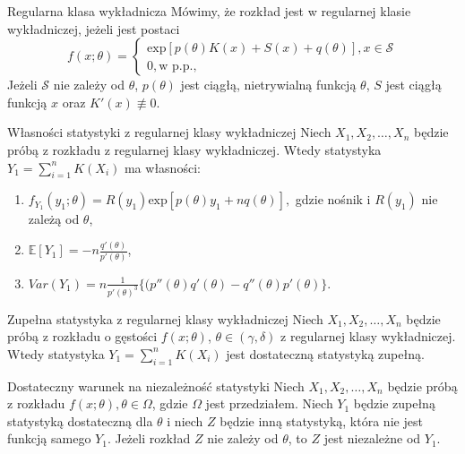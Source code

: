 \documentclass[avery5371, grid, frame]{flashcards}
\begin{document}
\begin{flashcard}[Definicja]{Regularna klasa wykładnicza}
    Mówimy, że rozkład jest w regularnej klasie wykładniczej, jeżeli jest postaci
    $$ f(x; \theta) =
    \begin{cases}
        \text{exp}[p(\theta) K(x) + S(x) + q(\theta)], x \in \mathcal{S} \\
        0, \text{w p.p.,} 
    \end{cases} $$
    Jeżeli $\mathcal{S}$ nie zależy od $\theta$, $p(\theta)$ jest ciągłą, nietrywialną funkcją $\theta$, $S$ jest ciągłą funkcją $x$ oraz $K'(x) \not\equiv 0$.
\end{flashcard}
    
\begin{flashcard}[Twierdzenie]{Własności statystyki z regularnej klasy wykładniczej}
    Niech $X_1, X_2, \dots, X_n$ będzie próbą z rozkładu z regularnej klasy wykładniczej. Wtedy statystyka $Y_1 = \sum_{i=1}^n K(X_i)$ ma własności:
    \begin{enumerate}
        \item $f_{Y_1}(y_1; \theta) = R(y_1) \text{exp}[p(\theta) y_1 + n q(\theta)],$ gdzie nośnik i $R(y_1)$ nie zależą od $\theta$,
        \item $\mathbb{E}[Y_1] = -n \frac{q'(\theta)}{p'(\theta)}$,
        \item $Var(Y_1) = n \frac{1}{p'(\theta)^3} \{ (p''(\theta)q'(\theta) - q''(\theta)p'(\theta) \} $.
    \end{enumerate}
\end{flashcard}

\begin{flashcard}[Twierdzenie]{Zupełna statystyka z regularnej klasy wykładniczej}
    Niech $X_1, X_2, \dots, X_n$ będzie próbą z rozkładu o gęstości $f(x; \theta)$, $\theta \in (\gamma, \delta)$ z regularnej klasy wykładniczej. Wtedy statystyka $Y_1 = \sum_{i=1}^n K(X_i)$ jest dostateczną statystyką zupełną.
\end{flashcard}

\begin{flashcard}[Twierdzenie]{Dostateczny warunek na niezależność statystyki}
    Niech $X_1, X_2, \dots, X_n$ będzie próbą z rozkładu $f(x; \theta), \theta \in \Omega$, gdzie $\Omega$ jest przedziałem. Niech $Y_1$ będzie zupełną statystyką dostateczną dla $\theta$ i niech $Z$ będzie inną statystyką, która nie jest funkcją samego $Y_1$. Jeżeli rozkład $Z$ nie zależy od $\theta$, to $Z$ jest niezależne od $Y_1$.
\end{flashcard}
\end{document}
